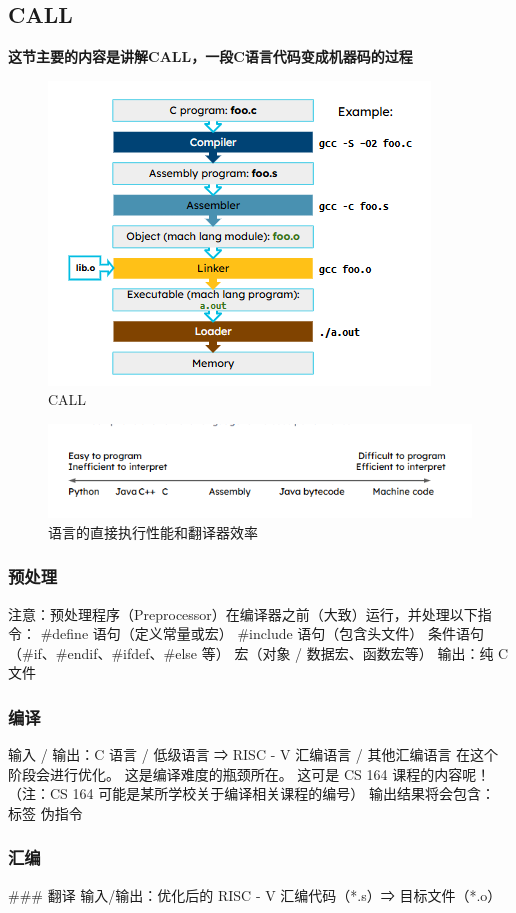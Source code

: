 \documentclass{ctexart}
\begin{document}
\subsection{CALL}
\textbf{这节主要的内容是讲解CALL，一段C语言代码变成机器码的过程}
\begin{figure}
    \centering
    \includegraphics[width=0.5\linewidth]{CALL.png}
    \caption{CALL}
    \label{fig:enter-label}
\end{figure}
\begin{figure}
    \centering
    \includegraphics[width=0.5\linewidth]{语言的直接执行性能和翻译器效率.png}
    \caption{语言的直接执行性能和翻译器效率}
    \label{fig:enter-label}
\end{figure}
\subsubsection{预处理}
注意：预处理程序（Preprocessor）在编译器之前（大致）运行，并处理以下指令：
#define 语句（定义常量或宏）
#include 语句（包含头文件）
条件语句（#if、#endif、#ifdef、#else 等）
宏（对象 / 数据宏、函数宏等）
输出：纯 C 文件
\subsubsection{编译}
输入 / 输出：C 语言 / 低级语言 ⇒ RISC - V 汇编语言 / 其他汇编语言
在这个阶段会进行优化。
这是编译难度的瓶颈所在。
这可是 CS 164 课程的内容呢！（注：CS 164 可能是某所学校关于编译相关课程的编号）
输出结果将会包含：
标签
伪指令
\subsubsection{汇编}
### 翻译
输入/输出：优化后的 RISC - V 汇编代码（*.s）⇒ 目标文件（*.o）\par
\end{document}
